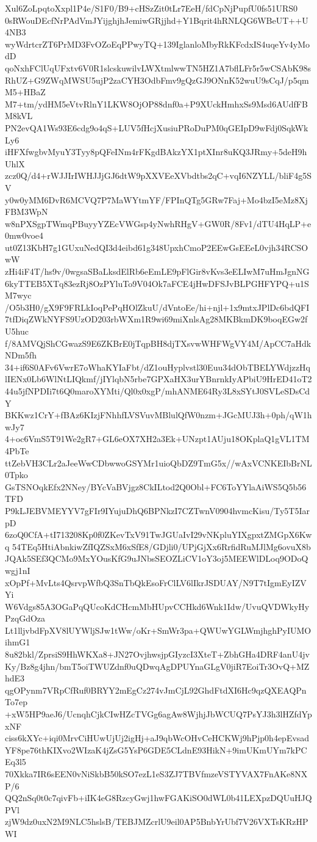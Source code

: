 Xul6ZoLpqtoXxpl1P4e/S1F0/B9+cHSzZit0tLr7EeH/fdCpNjPupfU0fs51URS0
0sRWouDEcfNrPAdVmJYijghjhJemiwGRjjhd+Y1Bqrit4hRNLQG6WBeUT++U4NB3
wyWdrtcrZT6PrMD3FvOZoEqPPwyTQ+139IglanloMbyRkKFcdxIS4uqeYv4yModD
qoNxhFClUqUFxtv6V0R1slcskuwilvLWXtmlwwTN5HZ1A7bflLFr5r5wCSAbK98s
RhUZ+G9ZWqMWSU5ujP2zaCYH3OdbFmv9gQzGJ9ONnK52wuU9sCqJ/p5qmM5+HBaZ
M7+tm/ydHM5eVtvRlnY1LKW8OjOP88dnf0a+P9XUckHmhxSs9Msd6AUdfFBM8kVL
PN2evQA1Ws93E6cdg9o4qS+LUV5fHcjXusiuPRoDuPM0qGEIpD9wFdj0SqkWkLy6
iHFXfwgbvMyuY3Tyy8pQFeINm4rFKgdBAkzYX1ptXInr8uKQ3JRmy+5deH9hUhlX
zcz0Q/d4+rWJJIrIWHJJjGJ6dtW9pXXVEeXVbdtbs2qC+vqI6NZYLL/bliF4g5SV
y0w0yMM6DvR6MCVQ7P7MaWYtmYF/FPInQTg5GRw7Faj+Mo4bzI5eMz8XjFBM3WpN
w8nPXSgpTWmqPBuyyYZEcVWGsp4yNwhRHgV+GW0R/8Fv1/dTU4HqLP+e0mw0voe4
ut0Z13KbH7g1GUxuNedQI3d4eibd61g348UpxhCmoP2EEwGsEEeL0vjh34RCSOwW
zHi4iF4T/hs9v/0wgsaSBaLksdElRb6eEmLE9pFlGir8vKvs3eELIwM7uHmJgnNG
6kyTTEB5XTq83ezRj8OzPYluTo9V04Ok7aFCE4jHwDFSJvBLPGHFYPQ+u1SM7wyc
/O5b3H0/gX9F9FRLkIoqPePqHOlZkuU/dVntoEe/hi+njl+1x9mtxJPlDc6bdQFI
7tfDiqZWkNYFS9UzOD203rbWXm1R9wi69miXnlsAg28MKBkmDK9boqEGw2fU5huc
f/8AMVQjShCGwazS9E6ZKBrE0jTqpBH8djTXsvwWHFWgVY4M/ApCC7aHdkNDm5fh
34+if6S0AFv6VwrE7oWhaKYIaFbt/dZ1ouHyplvstl30Euu34dObTBELYWdjzzHq
lIENx0Lb6WlNtLIQkmf/jIYlqbN5rbe7GPXaHX3urYBnrnkIyAPbiU9HrED41oT2
44u5jfNPDIi7t6Q0maroXYMti/Ql0x0xgP/mhANME64Ry3L8xSYtJ0SVLeSDsCdY
BKKwz1CrY+fBAz6KIzjFNhhfLVSVuvMBlulQfW0nzm+JGcMUJ3h+0ph/qW1hwJy7
4+oc6VmS5T91We2gR7+GL6eOX7XH2a3Ek+UNzpt1AUju18OKplaQ1gVL1TM4PbTe
ttZebVH3CLr2aJeeWwCDbwwoGSYMr1uioQbDZ9TmG5x//wAxVCNKEIbBrNL0Tpko
GsTSNOqkEfx2NNey/BYcVaBVjgz8CkILtod2Q0Obl+FC6ToYYlaAiWS5Q5b56TFD
P9kLJEBVMEYYV7gFIr9IYujuDhQ6BPNkzI7CZTwnV0904hvmcKisu/Ty5T5IarpD
6zoQ0CfA+tI713208Kp0f0ZKevTxV91TwJGUaIvI29vNKpluYIXgpxtZMGpX6Kwq
54TEq5HtiAbnkiwZfIQZSxM6xSfE8/GDjli0/UPjGjXx6RrfidRuMJlMg6ovuX8b
JQAk5SEf3QCMo9MxYOusKfG9uJNbsSEOZLiCV1oY3oj5MEEWlDLoq9ODoQwgj1nI
xOpPf+MvLts4QsrvpWfbQ3SnTbQkEsoFrClLV6lIkrJSDUAY/N9T7tIgmEyIZVYi
W6Vdgs85A3OGaPqQUcoKdCHcmMbHUpvCCHkd6Wnk1Idw/UvuQVDWkyHyPzqGdOza
Lt1lljvbdFpXV8lUYWljSJw1tWw/oKr+SmWr3pa+QWUwYGLWmjhghPyIUMOihmG1
8u82bkl/ZprsiS9HhWKXa8+JN27OvjhwsjpGIyzcI3XteT+ZbhGHa4DRF4anU4jv
Ky/Bz8g4jhn/bmT5oiTWUZdnf0uQDwqAgDPUYnaGLgV0jiR7EoiTr3OvQ+MZhdE3
qgOPynm7VRpCfRuf0BRYY2mEgCz274vJmCjL92GhdFtdXI6Hc9qzQXEAQPnTo7ep
+xW5HP9aeJ6/UcnqhCjkCIwHZcTVGg6agAw8WjhjJbWCUQ7PsYJ3h3lHZfdYpxNF
ciss6kXYc+iqi0MrvCiHUwUjUj2igHj+aJ9qbWcOHvCeHCKWj9hPjp0h4epEvsad
YF8pe76thKIXvo2WIzaK4jZsG5YsP6GDE5CLdnE93HikN+9imUKmUYm7kPCEq3l5
70Xkka7IR6sEEN0vNiSkbB50kSO7ezL1eS3ZJ7TBVfmzeVSTYVAX7FnAKe8NXP/6
QQ2nSq0t0c7qivFb+iIK4eG8RzcyGwj1hwFGAKiSO0dWL0b41LEXpzDQUuHJQPVl
zjW9dz0uxN2M9NLC5hslsB/TEBJMZcrlU9eil0AP5BnbYrUbf7V26VXTsKRzHPWI
